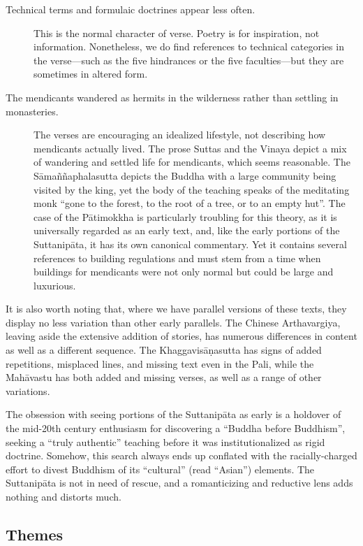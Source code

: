 \documentclass[12pt,openany]{book}%
\begin{document}
\begin{description}
\item[Technical terms and formulaic doctrines appear less often.] This is the normal character of verse. Poetry is for inspiration, not information. Nonetheless, we do find references to technical categories in the verse—such as the five hindrances or the five faculties—but they are sometimes in altered form.%
\item[The mendicants wandered as hermits in the wilderness rather than settling in monasteries.] The verses are encouraging an idealized lifestyle, not describing how mendicants actually lived. The prose Suttas and the Vinaya depict a mix of wandering and settled life for mendicants, which seems reasonable. The \textsanskrit{Sāmaññaphalasutta} depicts the Buddha with a large community being visited by the king, yet the body of the teaching speaks of the meditating monk “gone to the forest, to the root of a tree, or to an empty hut”. The case of the \textsanskrit{Pātimokkha} is particularly troubling for this theory, as it is universally regarded as an early text, and, like the early portions of the \textsanskrit{Suttanipāta}, it has its own canonical commentary. Yet it contains several references to building regulations and must stem from a time when buildings for mendicants were not only normal but could be large and luxurious.%
\end{description}

It is also worth noting that, where we have parallel versions of these texts, they display no less variation than other early parallels. The Chinese Arthavargiya, leaving aside the extensive addition of stories, has numerous differences in content as well as a different sequence. The \textsanskrit{Khaggavisāṇasutta} has signs of added repetitions, misplaced lines, and missing text even in the Pali, while the \textsanskrit{Mahāvastu} has both added and missing verses, as well as a range of other variations.

The obsession with seeing portions of the \textsanskrit{Suttanipāta} as early is a holdover of the mid-20th century enthusiasm for discovering a “Buddha before Buddhism”, seeking a “truly authentic” teaching before it was institutionalized as rigid doctrine. Somehow, this search always ends up conflated with the racially-charged effort to divest Buddhism of its “cultural” (read “Asian”) elements. The \textsanskrit{Suttanipāta} is not in need of rescue, and a romanticizing and reductive lens adds nothing and distorts much.

\subsection*{Themes}
\end{document}
